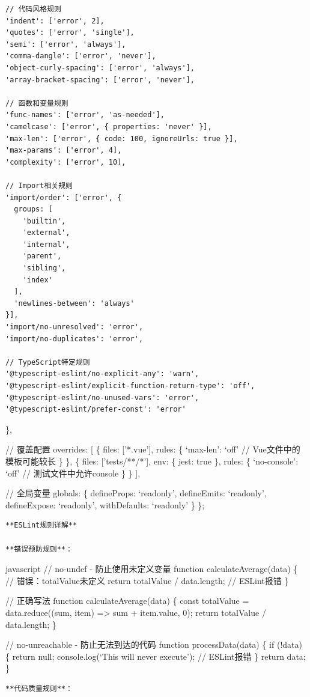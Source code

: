 {{\begin{verbatim}
// 代码风格规则
'indent': ['error', 2],
'quotes': ['error', 'single'],
'semi': ['error', 'always'],
'comma-dangle': ['error', 'never'],
'object-curly-spacing': ['error', 'always'],
'array-bracket-spacing': ['error', 'never'],

// 函数和变量规则
'func-names': ['error', 'as-needed'],
'camelcase': ['error', { properties: 'never' }],
'max-len': ['error', { code: 100, ignoreUrls: true }],
'max-params': ['error', 4],
'complexity': ['error', 10],

// Import相关规则
'import/order': ['error', {
  groups: [
    'builtin',
    'external', 
    'internal',
    'parent',
    'sibling',
    'index'
  ],
  'newlines-between': 'always'
}],
'import/no-unresolved': 'error',
'import/no-duplicates': 'error',

// TypeScript特定规则
'@typescript-eslint/no-explicit-any': 'warn',
'@typescript-eslint/explicit-function-return-type': 'off',
'@typescript-eslint/no-unused-vars': 'error',
'@typescript-eslint/prefer-const': 'error'
\end{verbatim}

\},

// 覆盖配置 overrides: {[} \{ files: {[}'*.vue'{]}, rules: \{ `max-len': `off' // Vue文件中的模板可能较长 \} \}, \{ files: {[}'tests/**/*'{]}, env: \{ jest: true \}, rules: \{ `no-console': `off' // 测试文件中允许console \} \} {]},

// 全局变量 globals: \{ defineProps: `readonly', defineEmits: `readonly', defineExpose: `readonly', withDefaults: `readonly' \} \};

\begin{lstlisting}
**ESLint规则详解**

**错误预防规则**：
\end{lstlisting}

javascript // no-undef - 防止使用未定义变量 function calculateAverage(data) \{ // 错误：totalValue未定义 return totalValue / data.length; // ESLint报错 \}

// 正确写法 function calculateAverage(data) \{ const totalValue = data.reduce((sum, item) =\textgreater{} sum + item.value, 0); return totalValue / data.length; \}

// no-unreachable - 防止无法到达的代码 function processData(data) \{ if (!data) \{ return null; console.log(`This will never execute'); // ESLint报错 \} return data; \}

\begin{lstlisting}
**代码质量规则**：
\end{lstlisting}

}}
